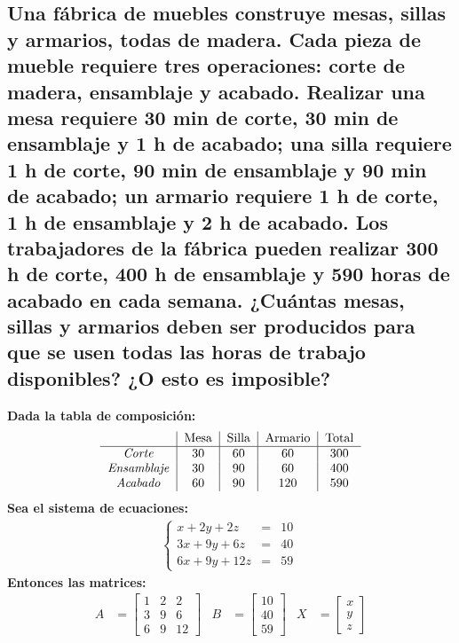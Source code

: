 \documentclass[10pt, a4paper]{article}
\begin{document}
\subsection{Una fábrica de muebles construye mesas, sillas y armarios, todas de madera. Cada pieza de mueble requiere tres operaciones: corte de madera, ensamblaje y acabado. Realizar una mesa requiere 30 min de corte, 30 min de ensamblaje y 1 h de acabado; una silla requiere 1 h de corte, 90 min de ensamblaje y 90 min de acabado; un armario requiere 1 h de corte, 1 h de ensamblaje y 2 h de acabado. Los trabajadores de la fábrica pueden realizar 300 h de corte, 400 h de ensamblaje y 590 horas de acabado en cada semana. ¿Cuántas mesas, sillas y armarios deben ser producidos para que se usen todas las horas de trabajo disponibles? ¿O esto es imposible?}
\textbullet\textbf{Dada la tabla de composición:}
\begin{align*}
  \begin{tabular}{c|c|c|c|c}
    & Mesa & Silla & Armario & Total\\
    \hline
    \textit{Corte} & 30 & 60 & 60 & 300\\
    \textit{Ensamblaje} & 30 & 90 & 60 & 400\\
    \textit{Acabado} &60 & 90 & 120 & 590
  \end{tabular}
\end{align*}
\textbullet\textbf{Sea el sistema de ecuaciones:}
\begin{align*}
  \left\{
  \begin{array}{rcl}
    x+2y+2z &= &10\\
    3x+9y+6z &= &40\\
    6x+9y+12z &= &59
  \end{array}
  \right.\
\end{align*}
\textbullet\textbf{Entonces las matrices:}
\begin{align*}
  A &= \begin{bmatrix}
    1 & 2 & 2\\
    3 & 9 & 6\\
    6 & 9 & 12
  \end{bmatrix}&
  B &= \begin{bmatrix}
    10\\
    40\\
    59
  \end{bmatrix}&
  X &= \begin{bmatrix}
    x\\
    y\\
    z
  \end{bmatrix}
\end{align*}
\end{document}
